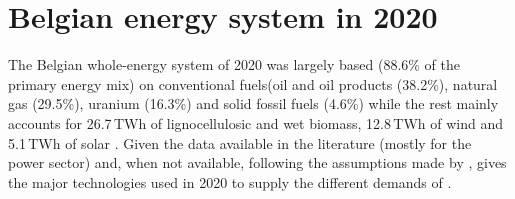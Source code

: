 \section{Belgian energy system in 2020} 
\label{app:bel_2020}
The Belgian whole-energy system of 2020 was largely based (88.6\% of the primary energy mix) on \og conventional fuels\fg (\ie oil and oil products (38.2\%), natural gas (29.5\%), uranium (16.3\%) and solid fossil fuels (4.6\%) while the rest mainly accounts for 26.7\,TWh of lignocellulosic and wet biomass, 12.8\,TWh of wind and 5.1\,TWh of solar \cite{spf_economy_2022}. Given the data available in the literature (mostly for the power sector) and, when not available, following the assumptions made by \citet{Limpens2020},  gives the major technologies used in 2020 to supply the different demands of .

